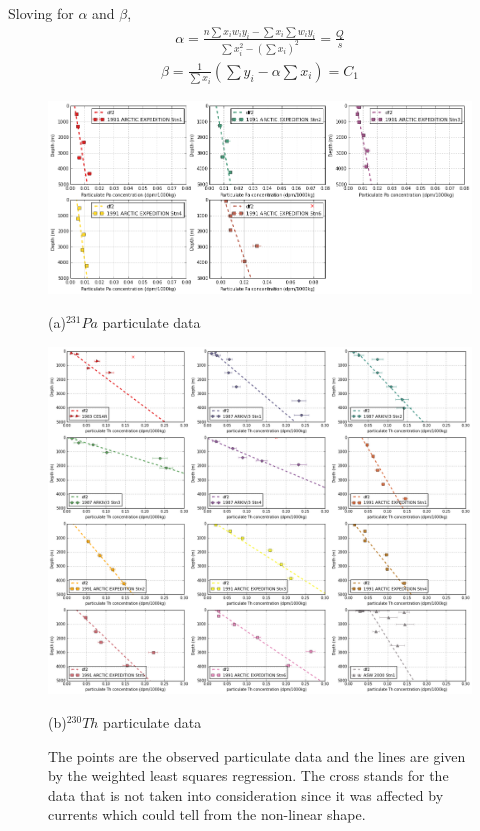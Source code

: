 \documentclass[paper=a4, fontsize=11pt]{scrartcl} %
\numberwithin{equation}{section} %
\numberwithin{figure}{section} %
\numberwithin{table}{section} %
\begin{document}
Sloving for $\alpha$ and $\beta$,
\begin{align}
\label{eq:WLS7}
\alpha = \frac{n\sum x_{i}w_{i}y_{i} -\sum x_{i}\sum w_{i}y_{i}}{\sum x_{i}^2 - \left(\sum x_{i}\right)^2}=\frac{Q}{s}
\end{align}
\begin{align}
\beta = \frac{1}{\sum x_{i}}\left(\sum y_{i}-\alpha\sum x_{i}\right)=C_{1}
\label{eq:WLS7.1}
\end{align}


\begin{figure}[!h]
\centering
  \includegraphics[width=30pc]{Figures/Part_Pa_all.pdf}
  \caption*{(a)$^{231}Pa$ particulate data}
\centering  
  \includegraphics[width=30pc]{Figures/Part_Th_all.pdf}
  \caption*{(b)$^{230}Th$ particulate data }
\caption{The points are the observed particulate data and the lines are given by the weighted least squares regression. The cross stands for the data that is not taken into consideration since it was affected by currents which could tell from the non-linear shape.}
 \label{fig:result_part}
\end{figure}
\end{document}

